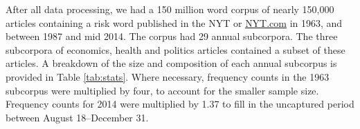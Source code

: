	After all data processing, we had a 150 million word corpus of nearly 150,000 articles containing a risk word published in the NYT or \url{NYT.com} in 1963, and between 1987 and mid 2014. The corpus had 29 annual subcorpora. The three subcorpora of economics, health and politics articles contained a subset of these articles. A breakdown of the size and composition of each annual subcorpus is provided in Table \ref{tab:stats}. Where necessary, frequency counts in the 1963 subcorpus were multiplied by four, to account for the smaller sample size. Frequency counts for 2014 were multiplied by 1.37 to fill in the uncaptured period between August 18--December 31.

	\begin{table}
	    \centering
	    \footnotesize
    \begin{tabular}{p{1.5cm}|l|l|l|l|}

\hline


\end{tabular}
\end{table}

